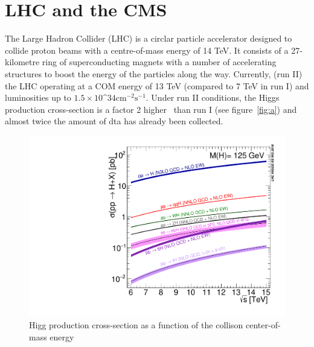 \documentclass[a4paper,11pt]{article}
\begin{document}
\section{LHC and the CMS}
\label{sec:lhccms} 
The Large Hadron Collider (LHC) is a circlar particle accelerator designed to collide proton beams with a centre-of-mass energy of 14 TeV. It consists of a 27-kilometre ring of superconducting magnets with a number of accelerating structures to boost the energy of the particles along the way. Currently, (run II) the LHC operating at a COM energy of 13 TeV (compared to 7 TeV in run I) and luminosities up to $1.5 \times 10\^{34} \mathrm{cm^{-2}s^{-1}}$. Under run II conditions, the Higgs production cross-section is a factor 2 higher~\cite{f} than run I (see figure~\ref{fig:a}) and almost twice the amount of dta has already been collected.     

\begin{figure}[htbp]
\centering
\includegraphics[width=.60\textwidth]{Plot_Escan_H125_new_sqrt.pdf}
\qquad
\caption{\label{fig:j} Higg production cross-section as a function of the collison center-of-mass energy  }
\end{figure}
\end{document}
